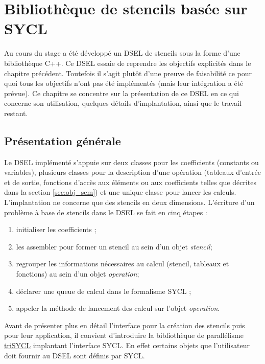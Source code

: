 
\chapter{Bibliothèque de stencils basée sur \textsf{SYCL}}

Au cours du stage a été développé un DSEL de stencils sous la forme d'une bibliothèque \textsf{C++}. Ce DSEL essaie de reprendre les objectifs explicités dans le chapitre précédent. Toutefois il s'agit plutôt d'une preuve de faisabilité ce pour quoi tous les objectifs n'ont pas été implémentés (mais leur intégration a été prévue). Ce chapitre se concentre sur la présentation de ce DSEL en ce qui concerne son utilisation, quelques détails d'implantation, ainsi que le travail restant.

\section{Présentation générale}

Le DSEL implémenté s'appuie sur deux classes pour les coefficients (constants ou variables), plusieurs classes pour la description d'une opération (tableaux d'entrée et de sortie, fonctions d'accès aux éléments ou aux coefficients telles que décrites dans la section \ref{sec:obj_sem}) et une unique classe pour lancer les calculs. L'implantation ne concerne que des stencils en deux dimensions. L'écriture d'un problème à base de stencils dans le DSEL se fait en cinq étapes :

\begin{enumerate}
\item initialiser les coefficients ;
\item les assembler pour former un stencil au sein d'un objet \emph{stencil};
\item regrouper les informations nécessaires au calcul (stencil, tableaux et fonctions) au sein d'un objet \emph{operation};
\item déclarer une queue de calcul dans le formalisme \textsf{SYCL} ;
\item appeler la méthode de lancement des calcul sur l'objet \emph{operation}.
\end{enumerate}

Avant de présenter plus en détail l'interface pour la création des stencils puis pour leur application, il convient d'introduire la bibliothèque de parallélisme \textsf{\href{https://github.com/amd/triSYCL}{triSYCL}} implantant l'interface \textsf{SYCL}. En effet certains objets que l'utilisateur doit fournir au DSEL sont définis par \textsf{SYCL}.

